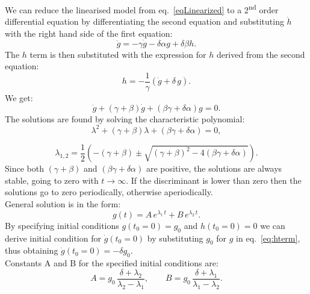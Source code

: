 \documentclass{article}
\begin{document}
We can reduce the linearised model from eq.~\ref{eqLinearized} to a 2\textsuperscript{nd} order differential equation by differentiating the second equation and substituting $\dot h$ with the right hand side of the first equation:
%
\begin{equation*}
\ddot g=-\gamma \dot g -\delta \alpha g + \delta \beta h.
\end{equation*}
%
 The $h$ term is then substituted with the expression for $h$ derived from the second equation:
% 
\begin{equation}
\label{eq:hterm}
h = -\frac{1}{\gamma}\left( \dot{g} + \delta\,g\right).
\end{equation} 
%
We get:
\begin{equation}
	\label{Eq:secondOrderDE}
	\ddot g+(\gamma+\beta)\dot g+(\beta \gamma+\delta \alpha)g=0.
\end{equation}
%
The solutions are found by solving the characteristic polynomial:
%
\begin{equation}
	\label{Eq:charEqn}
	\lambda^2+(\gamma+\beta)\lambda+(\beta\gamma+\delta\alpha)=0,
\end{equation}

\begin{equation}
	\label{Eq:rootsOfCharEqn}
	\lambda_{1,2}=\frac{1}{2}\left(-(\gamma+\beta)\pm \sqrt{(\gamma+\beta)^2-4(\beta\gamma+\delta\alpha)}\right).
\end{equation}
%
Since both $(\gamma+\beta)$ and $(\beta\gamma+\delta\alpha)$ are positive, the solutions are always stable, going to zero with $t\rightarrow \infty$. If the discriminant is lower than zero then the solutions go to zero periodically, otherwise aperiodically.\\
%
%
General solution is in the form:
\begin{equation}
	\label{Eq:genSol}
	g(t) = A\,e^{\lambda_1 \, t} + B\,e^{\lambda_2 \, t}.
\end{equation}
%
By specifying initial conditions $g(t_0=0) = g_0$ and $h(t_0=0)=0$ we can derive initial condition for $\dot g(t_0=0)$ by substituting $g_0$ for $g$ in eq.~\ref{eq:hterm}, thus obtaining $\dot g(t_0=0)=-\delta g_0$.\\
%
Constants A and B for the specified initial conditions are:
%
\begin{equation*}
	\label{Eq:genSolParams}
	A = g_0\,\frac{\delta+\lambda_2}{\lambda_2-\lambda_1}, \qquad B = g_0\,\frac{\delta+\lambda_1}{\lambda_1-\lambda_2}.
\end{equation*}
\end{document}
